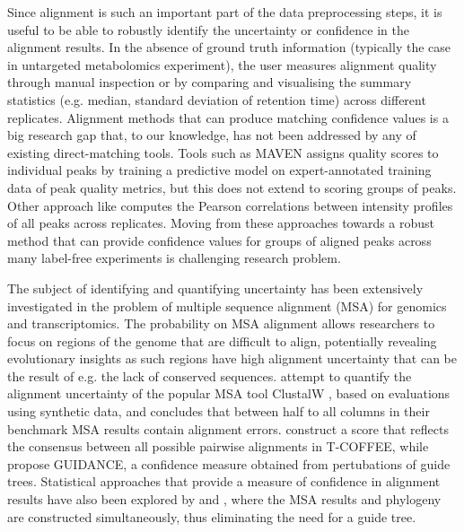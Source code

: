 Since alignment is such an important part of the data preprocessing steps, it is useful to be able to robustly identify the uncertainty or confidence in the alignment results. In the absence of ground truth information (typically the case in untargeted metabolomics experiment), the user measures alignment quality through manual inspection or by comparing and visualising the summary statistics (e.g. median, standard deviation of retention time) across different replicates. Alignment methods that can produce matching confidence values is a big research gap that, to our knowledge, has not been addressed by any of existing direct-matching tools. Tools such as MAVEN \cite{Melamud2010} assigns quality scores to individual peaks by training a predictive model on expert-annotated training data of peak quality metrics, but this does not extend to scoring groups of peaks. Other approach like \cite{Brodsky2010} computes the Pearson correlations between intensity profiles of all peaks across replicates. Moving from these approaches towards a robust method that can provide confidence values for groups of aligned peaks across many label-free experiments is challenging research problem.

The subject of identifying and quantifying uncertainty has been extensively investigated in the problem of multiple sequence alignment (MSA) for genomics and transcriptomics. The probability on MSA alignment allows researchers to focus on regions of the genome that are difficult to align, potentially revealing evolutionary insights as such regions have high alignment uncertainty that can be the result of e.g. the lack of conserved sequences. \cite{Landan2009} attempt to quantify the alignment uncertainty of the popular MSA tool ClustalW \cite{Thompson1994}, based on evaluations using synthetic data, and concludes that between half to all columns in their benchmark MSA results contain alignment errors. \cite{Notredame2000} construct a score that reflects the consensus between all possible pairwise alignments in T-COFFEE, while \cite{Penn2010} propose GUIDANCE, a confidence measure obtained from pertubations of guide trees. Statistical approaches that provide a measure of confidence in alignment results have also been explored by \cite{Redelings2005} and \cite{Bradley2009}, where the MSA results and phylogeny are constructed simultaneously, thus eliminating the need for a guide tree. 


